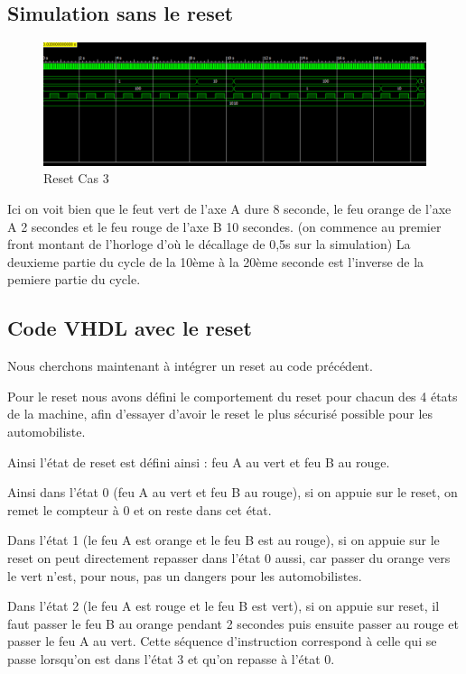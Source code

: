 \documentclass[11pt]{report}
\begin{document}
\subsection{Simulation sans le reset}

\begin{figure}[h]
\includegraphics[width=13cm]{TP03-5.png}
\caption{Reset Cas 3}
\end{figure}
 Ici on voit bien que le feut vert de l'axe A dure 8 seconde, le feu orange de l'axe A 2 secondes et le feu rouge de l'axe B 10 secondes.
(on commence au premier front montant de l'horloge d'où le décallage de 0,5s sur la simulation)
 La deuxieme partie du cycle de la 10ème à la 20ème seconde est l'inverse de la pemiere partie du cycle.
\subsection{Code VHDL avec le reset}

Nous cherchons maintenant à intégrer un reset au code précédent.

Pour le reset nous avons défini le comportement du reset pour chacun des 4 états de la machine, afin d'essayer d'avoir le reset le plus sécurisé possible pour les automobiliste.

Ainsi l'état de reset est défini ainsi : feu A au vert et feu B au rouge.

Ainsi dans l'état 0 (feu A au vert et feu B au rouge), si on appuie sur le reset, on remet le compteur à 0 et on reste dans cet état.

Dans l'état 1 (le feu A est orange et le feu B est au rouge), si on appuie sur le reset on peut directement repasser dans l'état 0 aussi, car passer du orange vers le vert n'est, pour nous, pas un dangers pour les automobilistes.

Dans l'état 2 (le feu A est rouge et le feu B est vert), si on appuie sur reset, il faut passer le feu B au orange pendant 2 secondes puis ensuite passer au rouge et passer le feu A au vert. Cette séquence d'instruction correspond à celle qui se passe lorsqu'on est dans l'état 3 et qu'on repasse à l'état 0.
\end{document}

